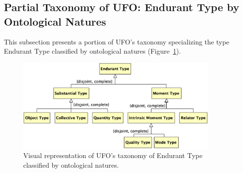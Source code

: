 \documentclass{article}
\newcommand{\me}[1]{\textsf{#1}}
\begin{document}
\subsection{Partial Taxonomy of UFO: \me{Endurant Type} by Ontological Natures}

This subsection presents a portion of UFO's taxonomy specializing the type \me{Endurant Type} classified by ontological natures (Figure~\ref{fig:04_taxonomy_endurant_type_nature}).

\begin{figure}[ht]
    \centering
    \includegraphics[width=0.9\textwidth]{diagrams/Endurant_Type_Natures_Diagram.png}
    \caption{Visual representation of UFO's taxonomy of \me{Endurant Type} classified by ontological natures.}
    \label{fig:04_taxonomy_endurant_type_nature}
\end{figure}
\end{document}

